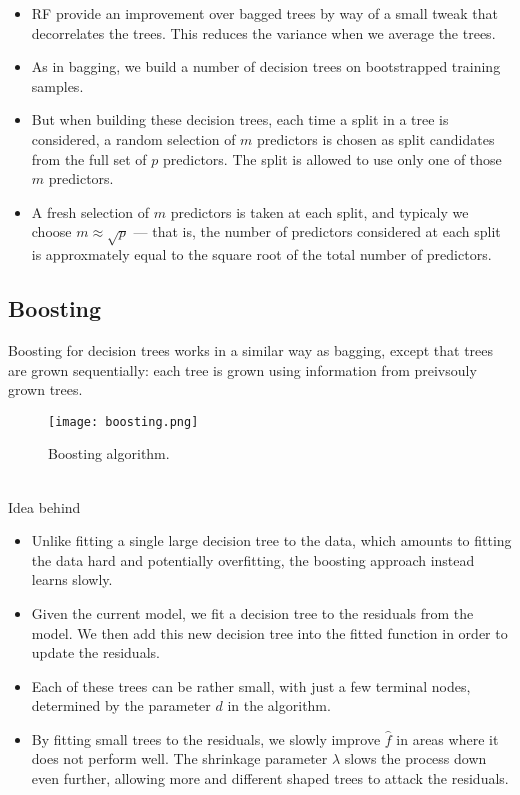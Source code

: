 \documentclass[11pt, a4paper]{article}
\begin{document}
\begin{itemize}
\item RF provide an improvement over bagged trees by way of a small tweak that decorrelates the trees. This reduces the variance when we average the trees.
\item As in bagging, we build a number of decision trees on bootstrapped training samples.
\item But when building these decision trees, each time a split in a tree is considered, a random selection of $m$ predictors is chosen as split candidates from the full set of $p$ predictors. The split is allowed to use only one of those $m$ predictors.
\item A fresh selection of $m$ predictors is taken at each split, and typicaly we choose $m\approx \sqrt{p}$ --- that is, the number of predictors considered at each split is approxmately equal to the square root of the total number of predictors.
\end{itemize}
\subsection{Boosting}
Boosting for decision trees works in a similar way as bagging, except that trees are grown sequentially: each tree is grown using information from preivsouly grown trees.
\begin{figure}
[h!]
\texttt{[image: boosting.png]}
\caption{Boosting algorithm.}
\end{figure}\\
Idea behind
\begin{itemize}
\item Unlike fitting a single large decision tree to the data, which amounts to fitting the data hard and potentially overfitting, the boosting approach instead learns slowly.
\item Given the current model, we fit a decision tree to the residuals from the model. We then add this new decision tree into the fitted function in order to update the residuals.
\item Each of these trees can be rather small, with just a few terminal nodes, determined by the parameter $d$ in the algorithm.
\item By fitting small trees to the residuals, we slowly improve $\hat{f}$ in areas where it does not perform well. The shrinkage parameter $\lambda$ slows the process down even further, allowing more and different shaped trees to attack the residuals.
\end{itemize}
\end{document}
